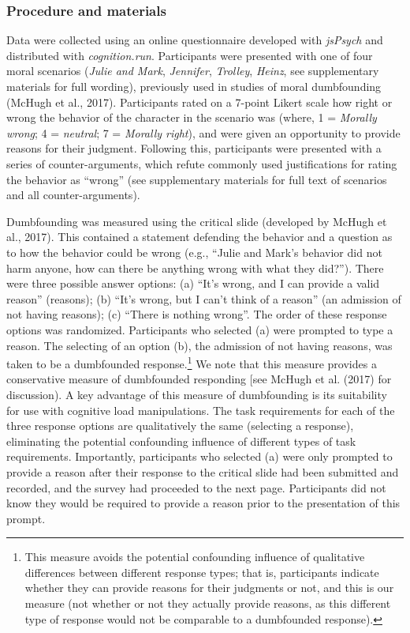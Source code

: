 \documentclass[
  american,
  man,floatsintext]{apa7}
\begin{document}
\hypertarget{procedure-and-materials}{%
\subsubsection{Procedure and materials}\label{procedure-and-materials}}

Data were collected using an online questionnaire developed with \emph{jsPsych} and distributed with \emph{cognition.run}. Participants were presented with one of four moral scenarios (\emph{Julie and Mark}, \emph{Jennifer}, \emph{Trolley}, \emph{Heinz}, see supplementary materials for full wording), previously used in studies of moral dumbfounding (McHugh et al., 2017). Participants rated on a 7-point Likert scale how right or wrong the behavior of the character in the scenario was (where, 1 = \emph{Morally wrong}; 4 = \emph{neutral}; 7 = \emph{Morally right}), and were given an opportunity to provide reasons for their judgment. Following this, participants were presented with a series of counter-arguments, which refute commonly used justifications for rating the behavior as \enquote{wrong} (see supplementary materials for full text of scenarios and all counter-arguments).

Dumbfounding was measured using the critical slide (developed by McHugh et al., 2017). This contained a statement defending the behavior and a question as to how the behavior could be wrong (e.g., \enquote{Julie and Mark's behavior did not harm anyone, how can there be anything wrong with what they did?}). There were three possible answer options: (a) \enquote{It's wrong, and I can provide a valid reason} (reasons); (b) \enquote{It's wrong, but I can't think of a reason} (an admission of not having reasons); (c) \enquote{There is nothing wrong}. The order of these response options was randomized. Participants who selected (a) were prompted to type a reason. The selecting of an option (b), the admission of not having reasons, was taken to be a dumbfounded response.\footnote{This measure avoids the potential confounding influence of qualitative differences between different response types; that is, participants indicate whether they can provide reasons for their judgments or not, and this is our measure (not whether or not they actually provide reasons, as this different type of response would not be comparable to a dumbfounded response).}
We note that this measure provides a conservative measure of dumbfounded responding {[}see McHugh et al. (2017) for discussion). A key advantage of this measure of dumbfounding is its suitability for use with cognitive load manipulations. The task requirements for each of the three response options are qualitatively the same (selecting a response), eliminating the potential confounding influence of different types of task requirements. Importantly, participants who selected (a) were only prompted to provide a reason after their response to the critical slide had been submitted and recorded, and the survey had proceeded to the next page. Participants did not know they would be required to provide a reason prior to the presentation of this prompt.
\end{document}
